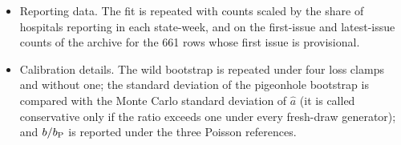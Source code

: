 \begin{itemize}
\item Reporting data. The fit is repeated with counts scaled by the share of hospitals reporting in each state-week, and on the first-issue and latest-issue counts of the archive for the 661 rows whose first issue is provisional.
\item Calibration details. The wild bootstrap is repeated under four loss clamps and without one; the standard deviation of the pigeonhole bootstrap is compared with the Monte Carlo standard deviation of $\hat a$ (it is called conservative only if the ratio exceeds one under every fresh-draw generator); and $b/b_{\mathrm P}$ is reported under the three Poisson references.
\end{itemize}

